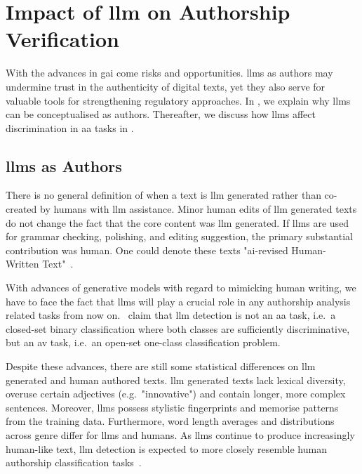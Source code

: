 \section{Impact of \acs{llm} on Authorship Verification}
\label{sec:llm_impact}

With the advances in \ac{gai} come risks and opportunities.
\Acp{llm} as authors may undermine trust in the authenticity of digital texts, yet they also serve for valuable tools for strengthening regulatory approaches.
In , we explain why \acp{llm} can be conceptualised as authors. 
Thereafter, we discuss how \acp{llm} affect discrimination in \ac{aa} tasks in .

\subsection{\acsp{llm} as Authors}
\label{subsec:llm_authors}

There is no general definition of when a text is \ac{llm} generated rather than co-created by humans with \ac{llm} assistance.
Minor human edits of \ac{llm} generated texts do not change the fact that the core content was \ac{llm} generated.
If \acp{llm} are used for grammar checking, polishing, and editing suggestion, the primary substantial contribution was human.
One could denote these texts "\acs{ai}-revised Human-Written Text"~\citep{revised_2024}.

With advances of generative models with regard to mimicking human writing, we have to face the fact that \acp{llm} will play a crucial role in any authorship analysis related tasks from now on.
\citet{llm_detection_av_2025}\ claim that \ac{llm} detection is not an \ac{aa} task, i.e.\ a closed-set binary classification where both classes are sufficiently discriminative, but an \ac{av} task, i.e.\ an open-set one-class classification problem. 

Despite these advances, there are still some statistical differences on \ac{llm} generated and human authored texts.
\ac{llm} generated texts lack lexical diversity, overuse certain adjectives (e.g.\ "innovative") and contain longer, more complex sentences.
Moreover, \acp{llm} possess stylistic fingerprints and memorise patterns from the training data.
Furthermore, word length averages and distributions across genre differ for \acp{llm} and humans.
As \acp{llm} continue to produce increasingly human-like text, \ac{llm} detection is expected to more closely resemble human authorship classification tasks~\citep{llm_detection_av_2025}.


